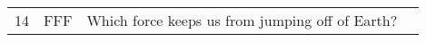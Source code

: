 \documentclass[10pt]{article}
\begin{document}
\begin{tiny}
\begin{longtable}{|r|p{0.375in}|p{1.275in}|p{3.5in}|}
14 &          FFF &                                                                                                                                                                                                                                  Which force keeps us from jumping off of Earth? &                                                                                                                                                                                                                                                                                                                                                                                                                                                                                                                                                                                                                                                                                                                                                                                                                                                                                                                                                                                                                                                                                                                                                                                                                                                                                                                                                                                                                                                                                                                                                                                                                                                                                                                                                                                                                                                                                                                                                                                                                                                                                                                                                                                                                                                                                                                                                                                                                                                                                                                                                                                                                                                                                                                                                                                                                                                                                                                                                                                                                                                                                               
\end{longtable}
\end{tiny}
\end{document}
